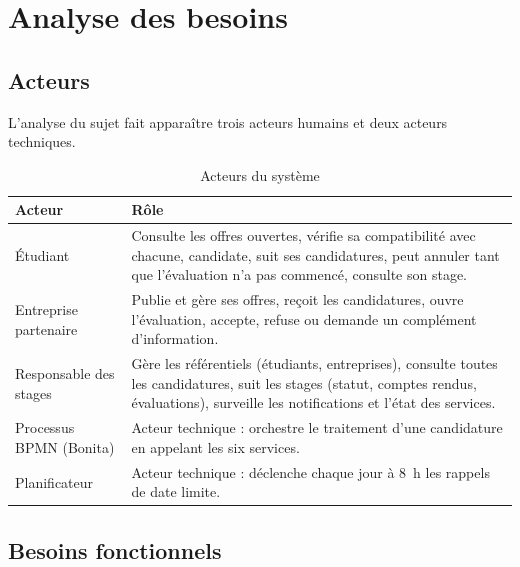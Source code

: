 \chapter{Analyse des besoins}\label{chap:besoins}

\section{Acteurs}

L'analyse du sujet fait apparaître trois acteurs humains et deux acteurs techniques.

\begin{table}[H]
\centering\small
\begin{tabularx}{\linewidth}{@{}l>{\raggedright\arraybackslash}X@{}}
\toprule
\textbf{Acteur} & \textbf{Rôle} \\ \midrule
Étudiant & Consulte les offres ouvertes, vérifie sa compatibilité avec chacune, candidate, suit ses candidatures, peut annuler tant que l'évaluation n'a pas commencé, consulte son stage. \\
Entreprise partenaire & Publie et gère ses offres, reçoit les candidatures, ouvre l'évaluation, accepte, refuse ou demande un complément d'information. \\
Responsable des stages & Gère les référentiels (étudiants, entreprises), consulte toutes les candidatures, suit les stages (statut, comptes rendus, évaluations), surveille les notifications et l'état des services. \\
Processus BPMN (Bonita) & Acteur technique : orchestre le traitement d'une candidature en appelant les six services. \\
Planificateur & Acteur technique : déclenche chaque jour à 8~h les rappels de date limite. \\
\bottomrule
\end{tabularx}
\caption{Acteurs du système}\label{tab:acteurs}
\end{table}

\section{Besoins fonctionnels}

